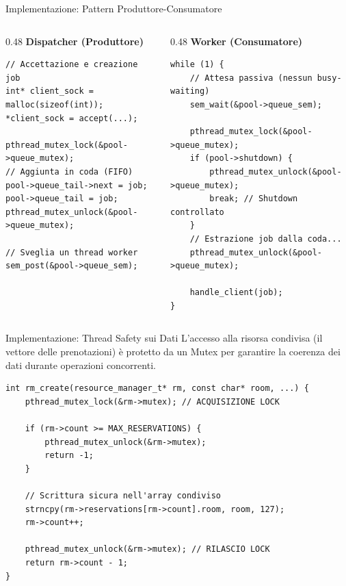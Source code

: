 \documentclass[aspectratio=169, 10pt]{beamer}
\begin{document}
\begin{frame}[fragile]{Implementazione: Pattern Produttore-Consumatore}
    \begin{columns}
        \begin{column}{0.48\textwidth}
            \textbf{Dispatcher (Produttore)}
\begin{lstlisting}[style=cstyle]
// Accettazione e creazione job
int* client_sock = malloc(sizeof(int));
*client_sock = accept(...);

pthread_mutex_lock(&pool->queue_mutex);
// Aggiunta in coda (FIFO)
pool->queue_tail->next = job;
pool->queue_tail = job;
pthread_mutex_unlock(&pool->queue_mutex);

// Sveglia un thread worker
sem_post(&pool->queue_sem);
\end{lstlisting}
        \end{column}
        
        \begin{column}{0.48\textwidth}
            \textbf{Worker (Consumatore)}
\begin{lstlisting}[style=cstyle]
while (1) {
    // Attesa passiva (nessun busy-waiting)
    sem_wait(&pool->queue_sem);
    
    pthread_mutex_lock(&pool->queue_mutex);
    if (pool->shutdown) {
        pthread_mutex_unlock(&pool->queue_mutex);
        break; // Shutdown controllato
    }
    // Estrazione job dalla coda...
    pthread_mutex_unlock(&pool->queue_mutex);
    
    handle_client(job);
}
\end{lstlisting}
        \end{column}
    \end{columns}
\end{frame}

\begin{frame}[fragile]{Implementazione: Thread Safety sui Dati}
    L'accesso alla risorsa condivisa (il vettore delle prenotazioni) è protetto da un Mutex per garantire la coerenza dei dati durante operazioni concorrenti.
    
\begin{lstlisting}[style=cstyle]
int rm_create(resource_manager_t* rm, const char* room, ...) {
    pthread_mutex_lock(&rm->mutex); // ACQUISIZIONE LOCK
    
    if (rm->count >= MAX_RESERVATIONS) {
        pthread_mutex_unlock(&rm->mutex);
        return -1;
    }
    
    // Scrittura sicura nell'array condiviso
    strncpy(rm->reservations[rm->count].room, room, 127);
    rm->count++;
    
    pthread_mutex_unlock(&rm->mutex); // RILASCIO LOCK
    return rm->count - 1;
}
\end{lstlisting}
\end{frame}
\end{document}
